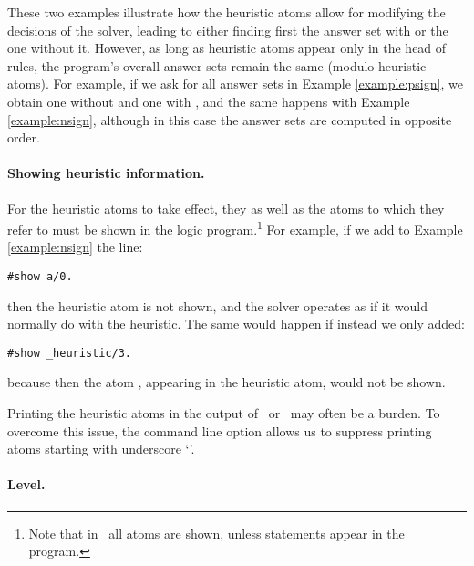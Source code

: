 These two examples illustrate how the heuristic atoms allow for modifying the decisions of the solver,
leading to either finding first the answer set with  or the one without it.
However, as long as heuristic atoms appear only in the head of rules,
the program's overall answer sets remain the same (modulo heuristic atoms).
For example, if we ask for all answer sets in Example \ref{example:psign},
we obtain one without  and one with ,
and the same happens with Example \ref{example:nsign}, 
although in this case the answer sets are computed in opposite order.

\paragraph{Showing heuristic information.}

For the heuristic atoms to take effect, they as well as the atoms to which they refer to
must be shown in the logic program.\footnote{Note that in \gringo\ all atoms are shown, 
  unless  statements appear in the program.}
For example, if we add to Example \ref{example:nsign} the line:
\begin{lstlisting}[numbers=none]
#show a/0.
\end{lstlisting}
then the heuristic atom is not shown, 
and the solver operates as if it would normally do with the  heuristic. 
The same would happen if instead we only added:
\begin{lstlisting}[numbers=none]
#show _heuristic/3.
\end{lstlisting}
because then the atom , appearing in the heuristic atom, would not be shown.

\begin{note}
Printing the heuristic atoms in the output of \clingo\ or \clasp\ may often be a burden.
To overcome this issue,
the command line option  allows us to suppress printing atoms starting with underscore `\code{\_}'.
\end{note}

\paragraph{Level.}

